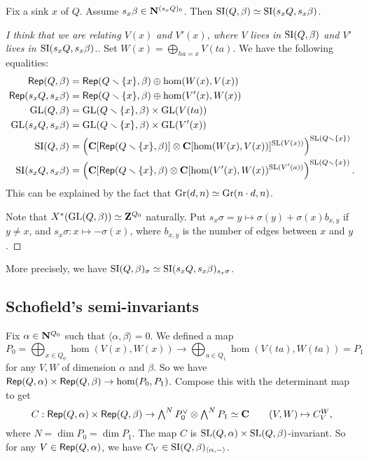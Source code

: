 \documentclass{article}
\begin{document}
\begin{theorem}[Kac]\label{thm:kac}
Fix a sink $x$ of $Q$. Assume $s_x \beta\in \mathbf{N}^{(s_x Q)_0}$. Then 
$\operatorname{SI}(Q,\beta) \simeq \operatorname{SI}(s_x Q,s_x \beta)$. 
\end{theorem}
\begin{proof}
[I think that we are relating $V(x)$ and $V'(x)$, where $V$ lives in 
$\operatorname{SI}(Q,\beta)$ and $V'$ lives in $\operatorname{SI}(s_x Q,s_x \beta)$.]

Set $W(x) = \bigoplus_{h a=x} V(t a)$. 
We have the following equalities:
\begin{align*}
  \operatorname{\mathsf{Rep}}(Q,\beta) &= \operatorname{\mathsf{Rep}}(Q\smallsetminus \{x\},\beta)\oplus \hom(W(x),V(x)) \\
  \operatorname{\mathsf{Rep}}(s_x Q,s_x \beta) &= \operatorname{\mathsf{Rep}}(Q\smallsetminus \{x\},\beta)\oplus \hom(V'(x),W(x)) \\
  \operatorname{GL}(Q,\beta) &= \operatorname{GL}(Q\smallsetminus \{x\},\beta) \times \operatorname{GL}(V(t a)) \\
  \operatorname{GL}(s_x Q,s_x \beta) &= \operatorname{GL}(Q\smallsetminus \{x\},\beta) \times \operatorname{GL}(V'(x)) \\
  \operatorname{SI}(Q,\beta) &= \left(\mathbf{C}[\operatorname{\mathsf{Rep}}(Q\smallsetminus \{x\},\beta)]\otimes \mathbf{C}[\hom(W(x),V(x))]^{\operatorname{SL}(V(x))}\right)^{\operatorname{SL}(Q\smallsetminus \{x\})} \\
  \operatorname{SI}(s_x Q,s_x \beta) &= \left(\mathbf{C}[\operatorname{\mathsf{Rep}}(Q\smallsetminus \{x\},\beta)\otimes \mathbf{C}[\hom(V'(x),W(x))^{\operatorname{SL}(V'(a))}\right)^{\operatorname{SL}(Q\smallsetminus\{x\})} .
\end{align*}
This can be explained by the fact that 
$\operatorname{Gr}(d,n) \simeq \operatorname{Gr}(n\cdot d,n)$. 

Note that $X^\ast(\operatorname{GL}(Q,\beta))\simeq \mathbf{Z}^{Q_0}$ naturally. Put 
$s_x \sigma = y\mapsto \sigma(y) + \sigma(x) b_{x,y}$ if $y\ne x$, and 
$s_x \sigma :x\mapsto -\sigma(x)$, where $b_{x,y}$ is the number of edges between 
$x$ and $y$. 
\end{proof}
More precisely, we have 
$\operatorname{SI}(Q,\beta)_\sigma \simeq \operatorname{SI}(s_x Q,s_x \beta)_{s_x \sigma}$. 


\subsection{Schofield's semi-invariants}

Fix $\alpha\in \mathbf{N}^{Q_0}$ such that $\langle \alpha,\beta\rangle = 0$. We defined 
a map 
\[
  P_0 = \bigoplus_{x\in Q_0} \hom(V(x),W(x)) \to \bigoplus_{a\in Q_1} \hom(V(t a), W(t a))= P_1 
\]
for any $V,W$ of dimension $\alpha$ and $\beta$. So we have 
$\operatorname{\mathsf{Rep}}(Q,\alpha)\times \operatorname{\mathsf{Rep}}(Q,\beta) \to \hom(P_0,P_1)$. 
Compose this with the determinant map to get 
\[
  C:\operatorname{\mathsf{Rep}}(Q,\alpha)\times \operatorname{\mathsf{Rep}}(Q,\beta) \to \textstyle\bigwedge^N P_0^\vee\otimes \bigwedge^N P_1\simeq \mathbf{C} \qquad (V,W)\mapsto C_V^W ,
\]
where $N=\dim P_0=\dim P_1$. The map $C$ is 
$\operatorname{SL}(Q,\alpha)\times \operatorname{SL}(Q,\beta)$-invariant. So for any 
$V\in \operatorname{\mathsf{Rep}}(Q,\alpha)$, we have 
$C_V\in \operatorname{SI}(Q,\beta)_{\langle \alpha,-\rangle}$. 
\end{document}
